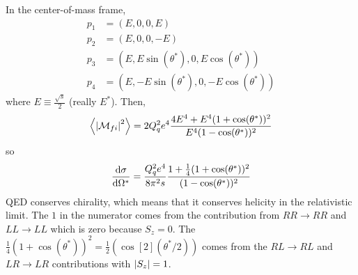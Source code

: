 \documentclass[a4paper,twoside,master.tex]{subfiles}
\begin{document}
In the center-of-mass frame,
\begin{align}
    p_1 &= (E,0,0,E) \\
    p_2 &= (E,0,0,-E) \\
    p_3 &= (E, E \sin(\theta^*), 0, E \cos(\theta^*)) \\
    p_4 &= (E, -E \sin(\theta^*), 0, -E \cos(\theta^*))
\end{align}
where $ E \equiv \frac{\sqrt{s}}{2} $ (really $ E^* $). Then,
\begin{equation}
    \ev{\abs{\mathcal{M}_{fi}}^2} = 2Q_q^2 e^4 \frac{4E^4 + E^4(1 + \cos(\theta^*))^2}{E^4(1 - \cos(\theta^*))^2}
\end{equation}
so
\begin{equation}
    \dv{\sigma}{\Omega^*} = \frac{Q_q^2 e^4}{8 \pi^2 s} \frac{1 + \frac{1}{4} (1 + \cos(\theta^*))^2}{(1 - \cos(\theta^*))^2}
\end{equation}
QED conserves chirality, which means that it conserves helicity in the relativistic limit. The $ 1 $ in the numerator comes from the contribution from $ RR \to RR $ and $ LL \to LL $ which is zero because $ S_z = 0 $. The $ \frac{1}{4}(1 + \cos(\theta^*))^2 = \frac{1}{2}(\cos[2](\theta^* / 2)) $ comes from the $ RL \to RL $ and $ LR \to LR $ contributions with $ \abs{S_z} = 1 $.
\end{document}
